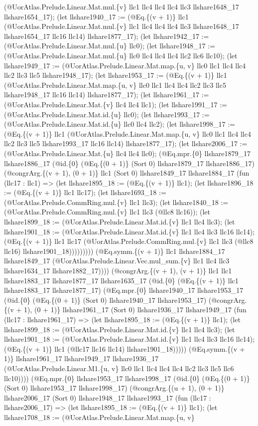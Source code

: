 \documentclass[11pt]{article}
\begin{document}
(@UorAtlas.Prelude.Linear.Mat.mul.\{v\} llc1 llc4 llc4 llc4 llc3 llshare1648\_17 llshare1654\_17); (let llshare1940\_17 := (@Eq.\{(v + 1)\} llc1 (@UorAtlas.Prelude.Linear.Mat.mul.\{v\} llc1 llc4 llc4 llc4 llc3 llshare1648\_17 llshare1654\_17 llc16 llc14) llshare1877\_17); (let llshare1942\_17 := (@UorAtlas.Prelude.Linear.Mat.mul.\{u\} llc0); (let llshare1948\_17 := (@UorAtlas.Prelude.Linear.Mat.mul.\{u\} llc0 llc4 llc4 llc4 llc2 llc6 llc10); (let llshare1949\_17 := (@UorAtlas.Prelude.Linear.Mat.map.\{u, v\} llc0 llc1 llc4 llc4 llc2 llc3 llc5 llshare1948\_17); (let llshare1953\_17 := (@Eq.\{(v + 1)\} llc1 (@UorAtlas.Prelude.Linear.Mat.map.\{u, v\} llc0 llc1 llc4 llc4 llc2 llc3 llc5 llshare1948\_17 llc16 llc14) llshare1877\_17); (let llshare1961\_17 := (@UorAtlas.Prelude.Linear.Mat.\{v\} llc4 llc4 llc1); (let llshare1991\_17 := (@UorAtlas.Prelude.Linear.Mat.id.\{u\} llc0); (let llshare1993\_17 := (@UorAtlas.Prelude.Linear.Mat.id.\{u\} llc0 llc4 llc2); (let llshare1998\_17 := (@Eq.\{(v + 1)\} llc1 (@UorAtlas.Prelude.Linear.Mat.map.\{u, v\} llc0 llc1 llc4 llc4 llc2 llc3 llc5 llshare1993\_17 llc16 llc14) llshare1877\_17); (let llshare2006\_17 := (@UorAtlas.Prelude.Linear.Mat.\{u\} llc4 llc4 llc0); (@Eq.mpr.\{0\} llshare1879\_17 llshare1886\_17 (@id.\{0\} (@Eq.\{(0 + 1)\} (Sort 0) llshare1879\_17 llshare1886\_17) (@congrArg.\{(v + 1), (0 + 1)\} llc1 (Sort 0) llshare1849\_17 llshare1884\_17 (fun (llc17 : llc1) => (let llshare1895\_18 := (@Eq.\{(v + 1)\} llc1); (let llshare1896\_18 := (@Eq.\{(v + 1)\} llc1 llc17); (let llshare1693\_18 := (@UorAtlas.Prelude.CommRing.mul.\{v\} llc1 llc3); (let llshare1840\_18 := (@UorAtlas.Prelude.CommRing.mul.\{v\} llc1 llc3 (@llc8 llc16)); (let llshare1899\_18 := (@UorAtlas.Prelude.Linear.Mat.id.\{v\} llc1 llc4 llc3); (let llshare1901\_18 := (@UorAtlas.Prelude.Linear.Mat.id.\{v\} llc1 llc4 llc3 llc16 llc14); (@Eq.\{(v + 1)\} llc1 llc17 (@UorAtlas.Prelude.CommRing.mul.\{v\} llc1 llc3 (@llc8 llc16) llshare1901\_18))))))))) (@Eq.symm.\{(v + 1)\} llc1 llshare1884\_17 llshare1849\_17 (@UorAtlas.Prelude.Linear.Vec.mul\_sum.\{v\} llc1 llc4 llc3 llshare1634\_17 llshare1882\_17)))) (@congrArg.\{(v + 1), (v + 1)\} llc1 llc1 llshare1883\_17 llshare1877\_17 llshare1635\_17 (@id.\{0\} (@Eq.\{(v + 1)\} llc1 llshare1883\_17 llshare1877\_17) (@Eq.mpr.\{0\} llshare1940\_17 llshare1953\_17 (@id.\{0\} (@Eq.\{(0 + 1)\} (Sort 0) llshare1940\_17 llshare1953\_17) (@congrArg.\{(v + 1), (0 + 1)\} llshare1961\_17 (Sort 0) llshare1936\_17 llshare1949\_17 (fun (llc17 : llshare1961\_17) => (let llshare1895\_18 := (@Eq.\{(v + 1)\} llc1); (let llshare1899\_18 := (@UorAtlas.Prelude.Linear.Mat.id.\{v\} llc1 llc4 llc3); (let llshare1901\_18 := (@UorAtlas.Prelude.Linear.Mat.id.\{v\} llc1 llc4 llc3 llc16 llc14); (@Eq.\{(v + 1)\} llc1 (@llc17 llc16 llc14) llshare1901\_18))))) (@Eq.symm.\{(v + 1)\} llshare1961\_17 llshare1949\_17 llshare1936\_17 (@UorAtlas.Prelude.Linear.M1.\{u, v\} llc0 llc1 llc4 llc4 llc4 llc2 llc3 llc5 llc6 llc10)))) (@Eq.mpr.\{0\} llshare1953\_17 llshare1998\_17 (@id.\{0\} (@Eq.\{(0 + 1)\} (Sort 0) llshare1953\_17 llshare1998\_17) (@congrArg.\{(u + 1), (0 + 1)\} llshare2006\_17 (Sort 0) llshare1948\_17 llshare1993\_17 (fun (llc17 : llshare2006\_17) => (let llshare1895\_18 := (@Eq.\{(v + 1)\} llc1); (let llshare1708\_18 := (@UorAtlas.Prelude.Linear.Mat.map.\{u, v\} 
\end{document}
